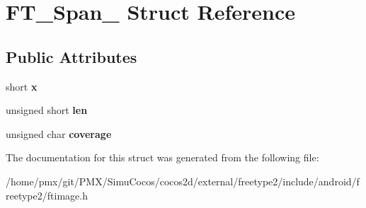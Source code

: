 \hypertarget{structFT__Span__}{}\section{F\+T\+\_\+\+Span\+\_\+ Struct Reference}
\label{structFT__Span__}
\subsection*{Public Attributes}
\begin{DoxyCompactItemize}
\item 
\mbox{\label{structFT__Span___a7f7235a404c66398b49c50fa09691ba5}} 
short {\bfseries x}
\item 
\mbox{\label{structFT__Span___a939c84317f25a97d0ba01704591a4d38}} 
unsigned short {\bfseries len}
\item 
\mbox{\label{structFT__Span___a70f9c9e0e8d3f0b38adee03a508ae214}} 
unsigned char {\bfseries coverage}
\end{DoxyCompactItemize}


The documentation for this struct was generated from the following file\+:\begin{DoxyCompactItemize}
\item 
/home/pmx/git/\+P\+M\+X/\+Simu\+Cocos/cocos2d/external/freetype2/include/android/freetype2/ftimage.\+h\end{DoxyCompactItemize}

